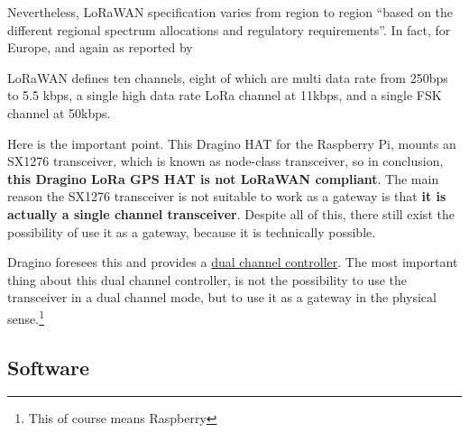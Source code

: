 \documentclass[11pt,a4paper,dvipsnames,twoside]{article}
\newcommand{\doubt}[1] {\textbf{\color{Red3}#1}}
\begin{document}
Nevertheless, LoRaWAN specification varies from region to region \enquote{based on
the different regional spectrum allocations and regulatory requirements}\cite[p.~12]{LoRaWANspec}. In fact, for Europe, and again as reported by \cite[p.~13]{LoRaWANspec} 

\begin{quoting}
LoRaWAN defines ten channels, eight of which are multi data rate from 250bps to
5.5 kbps, a single high data rate LoRa channel at 11kbps, and a single FSK channel
at 50kbps.
\end{quoting}

Here is the important point. This Dragino HAT for the Raspberry Pi, mounts an SX1276 transceiver, which is known as node-class transceiver, so in conclusion, \textbf{this Dragino LoRa GPS HAT is not LoRaWAN compliant}. The main reason the SX1276 transceiver is not suitable to work as a gateway is that \doubt{it is actually a single channel transceiver}. Despite all of this, there still exist the possibility of use it as a gateway, because it is technically possible. 


Dragino foresees this and provides a \href{https://github.com/dragino/dual_chan_pkt_fwd}{dual channel controller}. The most important thing about this dual channel controller, is not the possibility to use the transceiver in a dual channel mode, but to use it as a gateway in the physical sense.\footnote{This of course means Raspberry}





\subsection{Software}






















{}
\printbibliography
\end{document}
